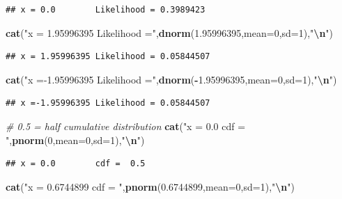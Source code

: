 \documentclass[
  lang=cn,
  11pt,
  scheme=chinese,
  chinesefont=nofont,
  citestyle=gb7714-2015,
  bibstyle=gb7714-2015]{elegantbook}
\newenvironment{Shaded}{\begin{snugshade}}{\end{snugshade}}
\newcommand{\AttributeTok}[1]{\textcolor[rgb]{0.13,0.29,0.53}{#1}}
\newcommand{\CommentTok}[1]{\textcolor[rgb]{0.56,0.35,0.01}{\textit{#1}}}
\newcommand{\DecValTok}[1]{\textcolor[rgb]{0.00,0.00,0.81}{#1}}
\newcommand{\FloatTok}[1]{\textcolor[rgb]{0.00,0.00,0.81}{#1}}
\newcommand{\FunctionTok}[1]{\textcolor[rgb]{0.13,0.29,0.53}{\textbf{#1}}}
\newcommand{\NormalTok}[1]{#1}
\newcommand{\SpecialCharTok}[1]{\textcolor[rgb]{0.81,0.36,0.00}{\textbf{#1}}}
\newcommand{\StringTok}[1]{\textcolor[rgb]{0.31,0.60,0.02}{#1}}
\begin{document}
\begin{verbatim}
## x = 0.0        Likelihood = 0.3989423
\end{verbatim}

\begin{Shaded}
\begin{Highlighting}[]
\FunctionTok{cat}\NormalTok{(}\StringTok{"x = 1.95996395 Likelihood ="}\NormalTok{,}\FunctionTok{dnorm}\NormalTok{(}\FloatTok{1.95996395}\NormalTok{,}\AttributeTok{mean=}\DecValTok{0}\NormalTok{,}\AttributeTok{sd=}\DecValTok{1}\NormalTok{),}\StringTok{"}\SpecialCharTok{\textbackslash{}n}\StringTok{"}\NormalTok{)   }
\end{Highlighting}
\end{Shaded}

\begin{verbatim}
## x = 1.95996395 Likelihood = 0.05844507
\end{verbatim}

\begin{Shaded}
\begin{Highlighting}[]
\FunctionTok{cat}\NormalTok{(}\StringTok{"x ={-}1.95996395 Likelihood ="}\NormalTok{,}\FunctionTok{dnorm}\NormalTok{(}\SpecialCharTok{{-}}\FloatTok{1.95996395}\NormalTok{,}\AttributeTok{mean=}\DecValTok{0}\NormalTok{,}\AttributeTok{sd=}\DecValTok{1}\NormalTok{),}\StringTok{"}\SpecialCharTok{\textbackslash{}n}\StringTok{"}\NormalTok{)   }
\end{Highlighting}
\end{Shaded}

\begin{verbatim}
## x =-1.95996395 Likelihood = 0.05844507
\end{verbatim}

\begin{Shaded}
\begin{Highlighting}[]
 \CommentTok{\# 0.5 = half cumulative distribution  }
\FunctionTok{cat}\NormalTok{(}\StringTok{"x = 0.0        cdf = "}\NormalTok{,}\FunctionTok{pnorm}\NormalTok{(}\DecValTok{0}\NormalTok{,}\AttributeTok{mean=}\DecValTok{0}\NormalTok{,}\AttributeTok{sd=}\DecValTok{1}\NormalTok{),}\StringTok{"}\SpecialCharTok{\textbackslash{}n}\StringTok{"}\NormalTok{)   }
\end{Highlighting}
\end{Shaded}

\begin{verbatim}
## x = 0.0        cdf =  0.5
\end{verbatim}

\begin{Shaded}
\begin{Highlighting}[]
\FunctionTok{cat}\NormalTok{(}\StringTok{"x = 0.6744899  cdf = "}\NormalTok{,}\FunctionTok{pnorm}\NormalTok{(}\FloatTok{0.6744899}\NormalTok{,}\AttributeTok{mean=}\DecValTok{0}\NormalTok{,}\AttributeTok{sd=}\DecValTok{1}\NormalTok{),}\StringTok{"}\SpecialCharTok{\textbackslash{}n}\StringTok{"}\NormalTok{)  }
\end{Highlighting}
\end{Shaded}
\end{document}
